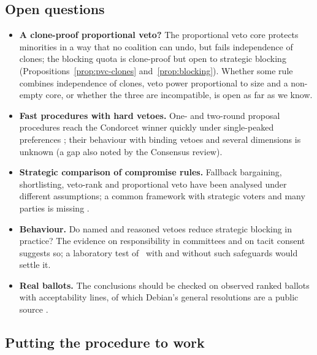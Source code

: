 \subsection{Open questions}

\begin{itemize}
  \item \textbf{A clone-proof proportional veto?} The proportional veto core protects minorities in a
  way that no coalition can undo, but fails independence of clones; the blocking quota is clone-proof
  but open to strategic blocking (Propositions~\ref{prop:pvc-clones} and~\ref{prop:blocking}). Whether
  some rule combines independence of clones, veto power proportional to size and a non-empty core, or
  whether the three are incompatible, is open as far as we know.
  \item \textbf{Fast procedures with hard vetoes.} One- and two-round proposal procedures reach the
  Condorcet winner quickly under single-peaked preferences \citep{Gersbach2025propose,GersbachValkanova2024};
  their behaviour with binding vetoes and several dimensions is unknown (a gap also noted by the Consensus
  review).
  \item \textbf{Strategic comparison of compromise rules.} Fallback bargaining, shortlisting, veto-rank and
  proportional veto have been analysed under different assumptions; a common framework with strategic
  voters and many parties is missing \citep{BarberaCoelho2022,CaillouxNapolitanoSanver2022}.
  \item \textbf{Behaviour.} Do named and reasoned vetoes reduce strategic blocking in practice? The
  evidence on responsibility in committees \citep{BreitmoserValasek2024} and on tacit consent
  \citep{Krick2017} suggests so; a laboratory test of \QVC\ with and without such safeguards would settle
  it.
  \item \textbf{Real ballots.} The conclusions should be checked on observed ranked ballots with
  acceptability lines, of which Debian's general resolutions are a public source
  \citep{Debian2024constitution,MatteiWalsh2013}.
\end{itemize}

\subsection{Putting the procedure to work}

